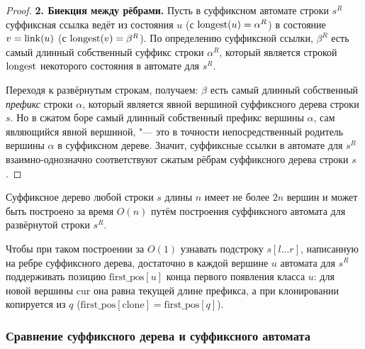 \begin{proof}
    \textbf{2. Биекция между рёбрами.} Пусть в суффиксном автомате строки $s^R$ суффиксная ссылка ведёт из состояния $u$ (с $\operatorname{longest}(u) = \alpha^R$) в состояние $v = \operatorname{link}(u)$ (с $\operatorname{longest}(v) = \beta^R$). По определению суффиксной ссылки, $\beta^R$ есть самый длинный собственный суффикс строки $\alpha^R$, который является строкой $\operatorname{longest}$ некоторого состояния в автомате для $s^R$.

    Переходя к развёрнутым строкам, получаем: $\beta$ есть самый длинный собственный \emph{префикс} строки $\alpha$, который является явной вершиной суффиксного дерева строки $s$. Но в сжатом боре самый длинный собственный префикс вершины $\alpha$, сам являющийся явной вершиной, "--- это в точности непосредственный родитель вершины $\alpha$ в суффиксном дереве. Значит, суффиксные ссылки в автомате для $s^R$ взаимно-однозначно соответствуют сжатым рёбрам суффиксного дерева строки $s$.
\end{proof}

\begin{corollary}
    Суффиксное дерево любой строки $s$ длины $n$ имеет не более $2n$ вершин и может быть построено за время $O(n)$ путём построения суффиксного автомата для развёрнутой строки $s^R$.
\end{corollary}

Чтобы при таком построении за $O(1)$ узнавать подстроку $s[l \dots r]$, написанную на ребре суффиксного дерева, достаточно в каждой вершине $u$ автомата для $s^R$ поддерживать позицию $\text{first\_pos}[u]$ конца первого появления класса $u$: для новой вершины $\text{cur}$ она равна текущей длине префикса, а при клонировании копируется из $q$ ($\text{first\_pos}[\text{clone}] = \text{first\_pos}[q]$).

\subsubsection{Сравнение суффиксного дерева и суффиксного автомата}

